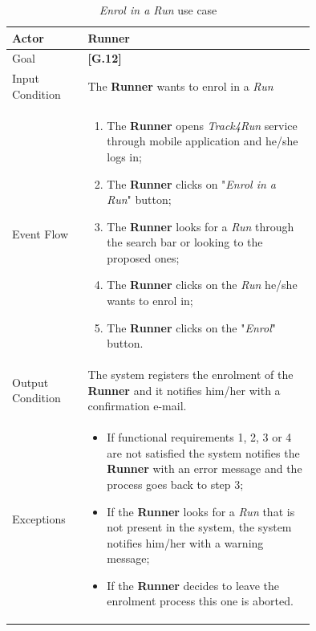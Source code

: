\begin{center}
\begin{table}[H]
\begin{tabular}{ | l | p{0.75\linewidth} | }
  \hline
    Actor & \textbf{Runner} \\ \hline
    Goal & \textbf{[G.12]} \\ \hline
    Input Condition & The \textbf{Runner} wants to enrol in a \textit{Run} \\ \hline
    Event Flow & \begin{minipage}[t]{0.7\textwidth}
      \begin{enumerate}
        \item The \textbf{Runner} opens \textit{Track4Run} service through mobile application and he/she logs in;
        \item The \textbf{Runner} clicks on "\textit{Enrol in a Run}" button;
        \item The \textbf{Runner} looks for a \textit{Run} through the search bar or looking to the proposed ones;
        \item The \textbf{Runner} clicks on the \textit{Run} he/she wants to enrol in;
        \item The \textbf{Runner} clicks on the "\textit{Enrol}" button.
      \end{enumerate}
    \smallskip
  \end{minipage} \\ \hline
  Output Condition & The system registers the enrolment of the \textbf{Runner} and it notifies him/her with a confirmation e-mail. \\ \hline
  Exceptions & \begin{minipage}[t]{0.7\textwidth}
    \begin{itemize}
      \smallskip
      \item If functional requirements 1, 2, 3 or 4 are not satisfied the system notifies the \textbf{Runner} with an error message and the process goes back to step 3;
      \item If the \textbf{Runner} looks for a \textit{Run} that is not present in the system, the system notifies him/her with a warning message;
      \item If the \textbf{Runner} decides to leave the enrolment process this one is aborted.
    \end{itemize}
    \smallskip
  \end{minipage}  \\ \hline
\end{tabular}
\caption{\textit{Enrol in a Run} use case}
\label{table:enrolRunTable}
\end{table}
\end{center}

